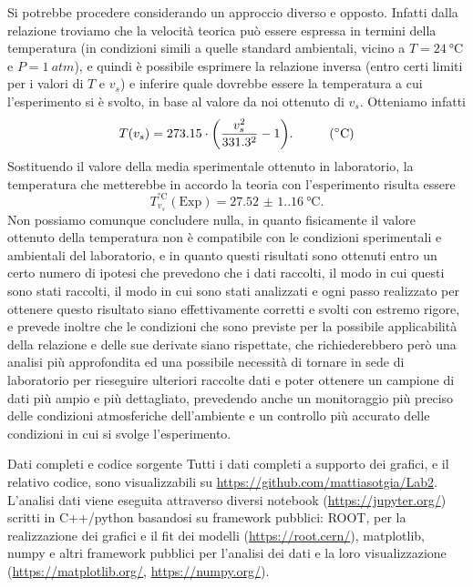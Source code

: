\documentclass[
    prl,
    reprint, 
    superscriptaddress, 
    altaffilletter, 
    amsmath, 
    amssymb, 
    a4paper,
    varvw]{revtex4-2}
\begin{document}
Si potrebbe procedere considerando un approccio diverso e opposto. Infatti dalla relazione  troviamo che la velocità teorica può essere espressa in termini della temperatura (in condizioni simili a quelle standard ambientali, vicino a $T=\SI{24}{\celsius}$ e $P=\SI{1}{atm}$), e quindi è possibile esprimere la relazione inversa (entro certi limiti per i valori di $T$ e $v_s$) e inferire quale dovrebbe essere la temperatura a cui l'esperimento si è svolto, in base al valore da noi ottenuto di $v_s$. Otteniamo infatti \begin{equation}
    T(v_s) = 273.15\cdot\qty(\frac{v_s^2}{331.3^2}-1).\hspace{1cm}(\si{\celsius})
\end{equation}
Sostituendo il valore della media sperimentale ottenuto in laboratorio, la temperatura che metterebbe in accordo la teoria con l'esperimento risulta essere \[T_{v_s}^{\si{\celsius}} (\text{Exp}) = \SI{27.52(1.16)}{\celsius}.\] Non possiamo comunque concludere nulla, in quanto fisicamente il valore ottenuto della temperatura non è compatibile con le condizioni sperimentali e ambientali del laboratorio, e in quanto questi risultati sono ottenuti entro un certo numero di ipotesi che prevedono che i dati raccolti, il modo in cui questi sono stati raccolti, il modo in cui sono stati analizzati e ogni passo realizzato per ottenere questo risultato siano effettivamente corretti e svolti con estremo rigore, e prevede inoltre che le condizioni che sono previste per la possibile applicabilità della relazione  e delle sue derivate siano rispettate, che richiederebbero però una analisi più approfondita ed una possibile necessità di tornare in sede di laboratorio per rieseguire ulteriori raccolte dati e poter ottenere un campione di dati più ampio e più dettagliato, prevedendo anche un monitoraggio più preciso delle condizioni atmosferiche dell'ambiente e un controllo più accurato delle condizioni in cui si svolge l'esperimento.


\begin{methods}{D\lowercase{ati completi e codice sorgente}}
    Tutti i dati completi a supporto dei grafici, e il relativo codice, sono visualizzabili su \url{https://github.com/mattiasotgia/Lab2}. L'analisi dati viene eseguita attraverso diversi notebook (\url{https://jupyter.org/}) scritti in C++/python basandosi su framework pubblici: ROOT, per la realizzazione dei grafici e il fit dei modelli (\url{https://root.cern/}), matplotlib, numpy e altri framework pubblici per l'analisi dei dati e la loro visualizzazione (\url{https://matplotlib.org/}, \url{https://numpy.org/}).
\end{methods}
\end{document}
